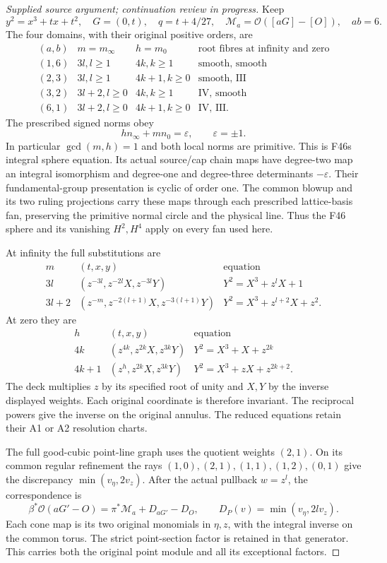 \begin{proof}[Supplied source argument; continuation review in progress]
Keep
\[
 y^2=x^3+tx+t^2,\quad G=(0,t),\quad q=t+4/27,
 \quad \mathcal M_a=\mathcal O([aG]-[O]),\quad ab=6.
\tag{JFP.1}
\]
The four domains, with their original positive orders, are
\[
\begin{array}{c|c|c|c}
(a,b)&m=m_\infty&h=m_0&\text{root fibres at infinity and zero}\\\hline
(1,6)&3l, l\ge1&4k, k\ge1&\text{smooth, smooth}\\
(2,3)&3l, l\ge1&4k+1, k\ge0&\text{smooth, III}\\
(3,2)&3l+2, l\ge0&4k, k\ge1&\text{IV, smooth}\\
(6,1)&3l+2, l\ge0&4k+1, k\ge0&\text{IV, III}.
\end{array}
\tag{JFP.2}
\]
The prescribed signed norms obey
\[
 h n_\infty+m n_0=\varepsilon,\qquad \varepsilon=\pm1.
\tag{JFP.3}
\]
In particular \(\gcd(m,h)=1\) and both local norms are primitive.
This is F46\textquotesingle s integral sphere equation. Its actual source/cap
chain maps have degree-two map an integral isomorphism and
degree-one and degree-three determinants \(-\varepsilon\).
Their fundamental-group presentation is cyclic of order one.
The common blowup and its two ruling projections carry these maps
through each prescribed lattice-basis fan, preserving the primitive
normal circle and the physical line. Thus the F46 sphere and its
vanishing \(H^2,H^4\) apply on every fan used here.

At infinity the full substitutions are
\[
\begin{array}{c|c|c}
m&(t,x,y)&\text{equation}\\\hline
3l&(z^{-3l},z^{-2l}X,z^{-3l}Y)&Y^2=X^3+z^lX+1\\
3l+2&(z^{-m},z^{-2(l+1)}X,z^{-3(l+1)}Y)&
Y^2=X^3+z^{l+2}X+z^2.
\end{array}
\tag{JFP.4}
\]
At zero they are
\[
\begin{array}{c|c|c}
h&(t,x,y)&\text{equation}\\\hline
4k&(z^{4k},z^{2k}X,z^{3k}Y)&Y^2=X^3+X+z^{2k}\\
4k+1&(z^h,z^{2k}X,z^{3k}Y)&Y^2=X^3+zX+z^{2k+2}.
\end{array}
\tag{JFP.5}
\]
The deck multiplies \(z\) by its specified root of unity and
\(X,Y\) by the inverse displayed weights. Each original coordinate
is therefore invariant. The reciprocal powers give the inverse
on the original annulus. The reduced equations retain their A1 or
A2 resolution charts.

The full good-cubic point-line graph uses the quotient weights
\((2,1)\). On its common regular refinement the rays
\((1,0),(2,1),(1,1),(1,2),(0,1)\) give the discrepancy
\(\min(v_\eta,2v_z)\). After the actual pullback \(w=z^l\),
the correspondence is
\[
 \beta^*\mathcal O(aG'-O)=\pi^*\mathcal M_a+D_{aG'}-D_O,
 \qquad D_P(v)=\min(v_\eta,2l v_z).
\tag{JFP.6}
\]
Each cone map is its two original monomials in \(\eta,z\), with
the integral inverse on the common torus. The strict point-section
factor is retained in that generator. This carries both the original
point module and all its exceptional factors.


\end{proof}
